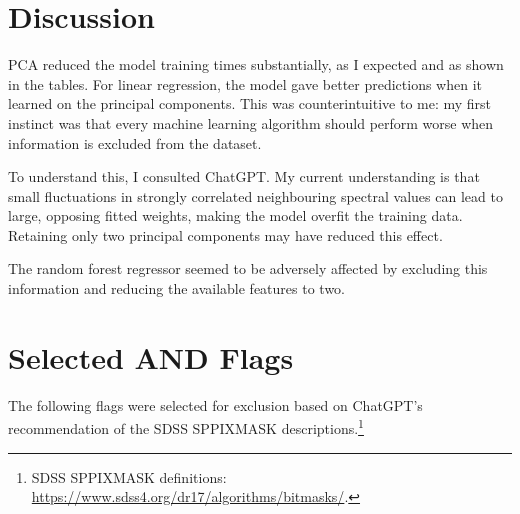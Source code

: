 \documentclass[12pt,a4paper]{article}
\begin{document}
\clearpage
\section{Discussion}

PCA reduced the model training times substantially, as I expected and as shown in the tables. For linear regression, the model gave better predictions when it learned on the principal components. This was counterintuitive to me: my first instinct was that every machine learning algorithm should perform worse when information is excluded from the dataset.

To understand this, I consulted ChatGPT. My current understanding is that small fluctuations in strongly correlated neighbouring spectral values can lead to large, opposing fitted weights, making the model overfit the training data. Retaining only two principal components may have reduced this effect.

The random forest regressor seemed to be adversely affected by excluding this information and reducing the available features to two.

\clearpage
\appendix
\section{Selected AND Flags}
\label{app:and-flags}

The following flags were selected for exclusion based on ChatGPT's recommendation of the SDSS SPPIXMASK descriptions.\footnote{SDSS SPPIXMASK definitions: \url{https://www.sdss4.org/dr17/algorithms/bitmasks/}.}
\end{document}
